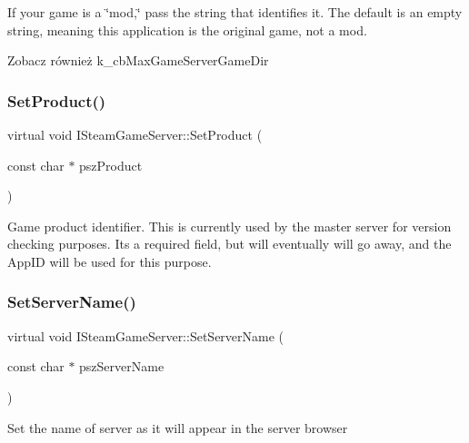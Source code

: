 If your game is a \char`\"{}mod,\char`\"{} pass the string that identifies it. The default is an empty string, meaning this application is the original game, not a mod.

\begin{DoxySeeAlso}{Zobacz również}
k\+\_\+cb\+Max\+Game\+Server\+Game\+Dir 
\end{DoxySeeAlso}
\mbox{\label{class_i_steam_game_server_a372776d31b9693579e5703f2a2ea2e69}} 
\subsubsection{\texorpdfstring{Set\+Product()}{SetProduct()}}
{\footnotesize\ttfamily virtual void I\+Steam\+Game\+Server\+::\+Set\+Product (\begin{DoxyParamCaption}\item[{const char $\ast$}]{psz\+Product }\end{DoxyParamCaption})\hspace{0.3cm}{\ttfamily [pure virtual]}}

Game product identifier. This is currently used by the master server for version checking purposes. It\textquotesingle{}s a required field, but will eventually will go away, and the App\+ID will be used for this purpose. \mbox{\label{class_i_steam_game_server_ab5f99b45fcc464d230d7cebad1ab149c}} 
\subsubsection{\texorpdfstring{Set\+Server\+Name()}{SetServerName()}}
{\footnotesize\ttfamily virtual void I\+Steam\+Game\+Server\+::\+Set\+Server\+Name (\begin{DoxyParamCaption}\item[{const char $\ast$}]{psz\+Server\+Name }\end{DoxyParamCaption})\hspace{0.3cm}{\ttfamily [pure virtual]}}

Set the name of server as it will appear in the server browser

